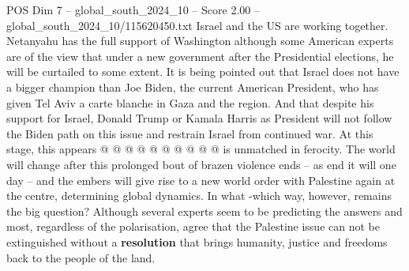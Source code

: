 \begin{textsample}{POS Dim 7 – global\_south\_2024\_10 – Score 2.00 – global\_south\_2024\_10/115620450.txt}
Israel and the US are working together.
Netanyahu has the full support of Washington although some American experts are of the view that under a new government after the Presidential elections, he will be curtailed to some extent.
It is being pointed out that Israel does not have a bigger champion than Joe Biden, the current American President, who has given Tel Aviv a carte blanche in Gaza and the region.
And that despite his support for Israel, Donald Trump or Kamala Harris as President will not follow the Biden path on this issue and restrain Israel from continued war.
At this stage, this appears @ @ @ @ @ @ @ @ @ @ is unmatched in ferocity.
The world will change after this prolonged bout of brazen violence ends -- as end it will one day -- and the embers will give rise to a new world order with Palestine again at the centre, determining global dynamics.
In what -which way, however, remains the big question?
Although several experts seem to be predicting the answers and most, regardless of the polarisation, agree that the Palestine issue can not be extinguished without a \textbf{resolution} that brings humanity, justice and freedoms back to the people of the land.

\end{textsample}
